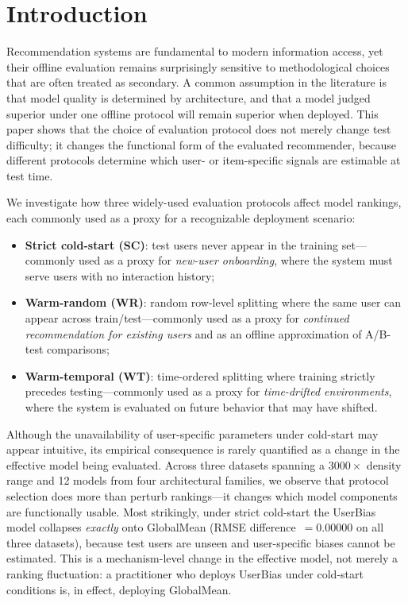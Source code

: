 \documentclass[journal]{IEEEtran}
\begin{document}
\section{Introduction}
\label{sec:intro}

Recommendation systems are fundamental to modern information access, yet their offline evaluation remains surprisingly sensitive to methodological choices that are often treated as secondary. A common assumption in the literature is that model quality is determined by architecture, and that a model judged superior under one offline protocol will remain superior when deployed. This paper shows that the choice of evaluation protocol does not merely change test difficulty; it changes the functional form of the evaluated recommender, because different protocols determine which user- or item-specific signals are estimable at test time.

We investigate how three widely-used evaluation protocols affect model rankings, each commonly used as a proxy for a recognizable deployment scenario:
\begin{itemize}
    \item \textbf{Strict cold-start (SC)}: test users never appear in the training set---commonly used as a proxy for \emph{new-user onboarding}, where the system must serve users with no interaction history;
    \item \textbf{Warm-random (WR)}: random row-level splitting where the same user can appear across train/test---commonly used as a proxy for \emph{continued recommendation for existing users} and as an offline approximation of A/B-test comparisons;
    \item \textbf{Warm-temporal (WT)}: time-ordered splitting where training strictly precedes testing---commonly used as a proxy for \emph{time-drifted environments}, where the system is evaluated on future behavior that may have shifted.
\end{itemize}

Although the unavailability of user-specific parameters under cold-start may appear intuitive, its empirical consequence is rarely quantified as a change in the effective model being evaluated. Across three datasets spanning a $3000\times$ density range and 12 models from four architectural families, we observe that protocol selection does more than perturb rankings---it changes which model components are functionally usable. Most strikingly, under strict cold-start the UserBias model collapses \emph{exactly} onto GlobalMean (RMSE difference~$=0.00000$ on all three datasets), because test users are unseen and user-specific biases cannot be estimated. This is a mechanism-level change in the effective model, not merely a ranking fluctuation: a practitioner who deploys UserBias under cold-start conditions is, in effect, deploying GlobalMean.
\end{document}

